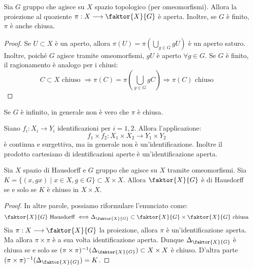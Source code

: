 \begin{prop}
Sia $G$ gruppo che agisce su $X$ spazio topologico (per omeomorfismi). Allora la proiezione al quoziente $\pi:X \longrightarrow \faktor {X}{G}$ è aperta. Inoltre, se $G$ è finito, $\pi$ è anche chiusa.
\end{prop}
\begin{proof}
Se $U \subset X$ è un aperto, allora $\pi (U)=\pi \left(\bigcup _{g \in G} gU\right)$ è un aperto saturo. Inoltre, poiché $G$ agisce tramite omeomorfismi, $gU$ è aperto $\forall g \in G$. Se $G$ è finito, il ragionamento è analogo per i chiusi:
$$C \subset X \text{ chiuso } \Longrightarrow \pi(C)=\pi\left(\bigcup _{g \in G} gC\right) \Longrightarrow \pi(C) \text{ chiuso}$$
\end{proof}

\begin{oss}
Se $G$ è infinito, in generale non è vero che $\pi$ è chiusa.
\end{oss}

\begin{oss}
Siano $f_i:X_i \longrightarrow Y_i$ identificazioni per $i=1,2$. Allora l'applicazione:
$$f_1 \times f_2:X_1 \times X_2 \longrightarrow Y_1 \times Y_2$$
è continua e surgettiva, ma in generale non è un'identificazione. Inoltre il prodotto cartesiano di identificazioni aperte è un'identificazione aperta.
\end{oss}

\begin{prop}
Sia $X$ spazio di Hausdorff e $G$ gruppo che agisce su $X$ tramite omeomorfismi. Sia $K=\{(x,gx) \mid x \in X, g \in G \} \subset X \times X$. Allora $\faktor {X}{G}$ è di Hausdorff se e solo se $K$ è chiuso in $X \times X$.
\end{prop}
\begin{proof}
In altre parole, possiamo riformulare l'enunciato come:
$$\faktor{X}{G} \text{ Hausdorff } \Longleftrightarrow \Delta_{\faktor{X}{G}} \subset \faktor{X}{G} \times \faktor{X}{G} \text{ chiusa}$$
Sia $\pi:X \longrightarrow \faktor{X}{G}$ la proiezione, allora $\pi$ è un'identificazione aperta. Ma allora $\pi \times \pi$ è a sua volta identificazione aperta. Dunque $\Delta _{\faktor{X}{G}}$ è chiusa se e solo se $(\pi \times \pi)^{-1}(\Delta _{\faktor{X}{G}}) \subset X \times X$ è chiuso. D'altra parte $(\pi \times \pi)^{-1}(\Delta _{\faktor{X}{G}})=K$.
\end{proof}

